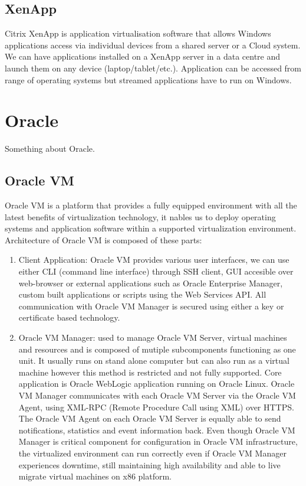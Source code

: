 \begin{itemize}
\subsection{XenApp}
Citrix XenApp is application virtualisation software that allows Windows applications access via individual devices from a shared server or a Cloud system. We can have applications installed on a XenApp server in a data centre and launch them on any device (laptop/tablet/etc.). Application can be accessed from range of operating systems but streamed applications have to run on Windows.


\section{Oracle}
Something about Oracle.

\subsection{Oracle VM}
Oracle VM is a platform that provides a fully equipped environment with all the latest benefits of virtualization technology, it nables us to deploy operating systems and application software within a supported virtualization environment.
Architecture of Oracle VM is composed of these parts:
\begin{enumerate}
\item Client Application: Oracle VM provides various user interfaces, we can use either CLI (command line interface) through SSH client, GUI accesible over web-browser or external applications such as Oracle Enterprise Manager, custom built applications or scripts using the Web Services API. All communication with Oracle VM Manager is secured using either a key or certificate based technology.
\item Oracle VM Manager: used to manage Oracle VM Server, virtual machines and resources and is composed of mutiple subcomponents functioning as one unit. It usually runs on stand alone computer but can also run as a virtual machine however this method is restricted and not fully supported. Core application is Oracle WebLogic application running on Oracle Linux. Oracle VM Manager communicates with each Oracle VM Server via the Oracle VM Agent, using XML-RPC (Remote Procedure Call using XML) over HTTPS.  The Oracle VM Agent on each Oracle VM Server is equally able to send notifications, statistics and event information back. Even though Oracle VM Manager is critical component for configuration in Oracle VM infrastructure, the virtualized environment can run correctly even if Oracle VM Manager experiences downtime, still maintaining high availability and able to live migrate virtual machines on x86 platform.

\end{enumerate}
\end{itemize}
